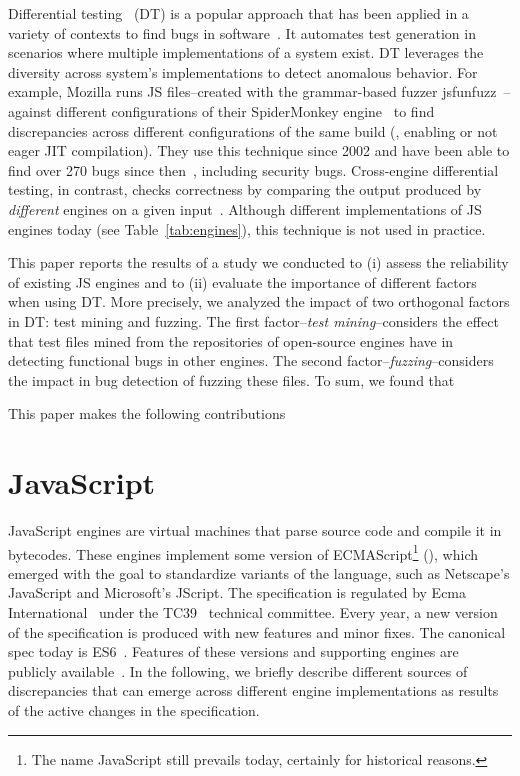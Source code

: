 \documentclass[10pt,conference,anonymous]{IEEEtran}
\begin{document}
Differential testing~\cite{Brumley-etal-ss07} (DT) is a popular
approach that has been applied in a variety of contexts to find bugs
in
software~\cite{Yang-etal-pldi11,Chen-etal-fse2015,Argyros-etla-ccs16,Chen-etal-pldi16,petsios-etal-sp2017,SivakornAPKJ17}. It
automates test generation in scenarios where multiple implementations
of a system exist. DT leverages the diversity across system's
implementations to detect anomalous behavior. For example, Mozilla
runs JS files--created with the grammar-based fuzzer
jsfunfuzz~\cite{jsfunfuzz}--against different configurations of their
SpiderMonkey engine~\cite{jsfunfuzz-mozilla-bug} to find discrepancies
across different configurations of the same build (\eg{}, enabling or
not eager JIT compilation). They use this technique since 2002 and
have been able to find over 270 bugs since
then~\cite{jsfunfuzz-at-mozilla}, including security bugs.
Cross-engine differential testing, in contrast, checks correctness by
comparing the output produced by \emph{different} engines on a given
input~\cite{patra2016learning}. Although different implementations of
JS engines today (see Table~\ref{tab:engines}), this technique is not
used in practice.

This paper reports the results of a study we conducted to (i) assess
the reliability of existing JS engines and to (ii) evaluate the
importance of different factors when using DT. More precisely, we
analyzed the impact of two orthogonal factors in DT: test mining and
fuzzing. The first factor--\emph{test mining}--considers the effect
that \js{} test files mined from the repositories of open-source
engines have in detecting functional bugs in other engines. The second
factor--\emph{fuzzing}--considers the impact in bug detection of
fuzzing these files.
To sum, we found that 

This paper makes the following contributions 

\section{JavaScript}
\label{sec:es6-design}

JavaScript engines are virtual machines that parse source code and
compile it in bytecodes. These engines implement some version of
ECMAScript\footnote{The name JavaScript still prevails today,
  certainly for historical reasons.} (\es{}), which emerged with the
goal to standardize variants of the language, such as Netscape's
JavaScript and Microsoft's JScript. The \es{} specification is
regulated by Ecma International~\cite{es6-website} under the
TC39~\cite{tc39-github} technical committee.  Every year, a new
version of the \es{} specification is produced with new features and
minor fixes. The canonical spec today is
ES6~\cite{ecmas262-spec-repo,ecmas262-spec}. Features of these
versions and supporting engines are publicly available~\cite{kangax}.
In the following, we briefly describe different sources of
discrepancies that can emerge across different engine implementations
as results of the active changes in the \es{} specification.
\end{document}
